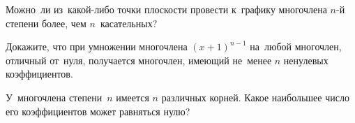 \begin{problems}
\iffalse
\fi

\item
Можно~ли из~какой-либо точки плоскости провести к~графику многочлена $n$-й
степени более, чем $n$~касательных?



\item
Докажите, что при умножении многочлена $(x + 1)^{n-1}$ на~любой многочлен,
отличный от~нуля, получается многочлен, имеющий не~менее $n$ ненулевых
коэффициентов.

\item
У~многочлена степени~$n$ имеется $n$ различных корней.
Какое наибольшее число его коэффициентов может равняться нулю?


\end{problems}

